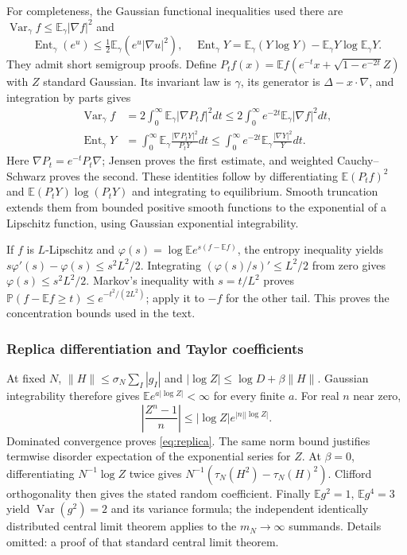 \documentclass[11pt]{article}
\numberwithin{equation}{section}
\theoremstyle{exposition}
\theoremstyle{result}
\newcommand{\E}{\mathbb E}
\newcommand{\Pp}{\mathbb P}
\begin{document}
For completeness, the Gaussian functional inequalities used there are $\operatorname{Var}_\gamma f\leq\E_\gamma|\nabla f|^2$ and
\begin{equation*}
\operatorname{Ent}_\gamma(e^u)
\leq\tfrac12\E_\gamma(e^u|\nabla u|^2),\quad
\operatorname{Ent}_\gamma Y=\E_\gamma(Y\log Y)-\E_\gamma Y\log\E_\gamma Y.
\end{equation*}
They admit short semigroup proofs. Define $P_tf(x)=\E f(e^{-t}x+\sqrt{1-e^{-2t}}Z)$ with $Z$ standard Gaussian. Its invariant law is $\gamma$, its generator is $\Delta-x\cdot\nabla$, and integration by parts gives
\begin{align*}
\operatorname{Var}_\gamma f
&=2\int_0^\infty\E_\gamma|\nabla P_tf|^2dt
\leq2\int_0^\infty e^{-2t}\E_\gamma|\nabla f|^2dt,\\
\operatorname{Ent}_\gamma Y
&=\int_0^\infty\E_\gamma\frac{|\nabla P_tY|^2}{P_tY}dt
\leq\int_0^\infty e^{-2t}\E_\gamma\frac{|\nabla Y|^2}{Y}dt.
\end{align*}
Here $\nabla P_t=e^{-t}P_t\nabla$; Jensen proves the first estimate, and weighted Cauchy--Schwarz proves the second. These identities follow by differentiating $\E(P_tf)^2$ and $\E(P_tY)\log(P_tY)$ and integrating to equilibrium. Smooth truncation extends them from bounded positive smooth functions to the exponential of a Lipschitz function, using Gaussian exponential integrability.

If $f$ is $L$-Lipschitz and $\varphi(s)=\log\E e^{s(f-\E f)}$, the entropy inequality yields $s\varphi'(s)-\varphi(s)\leq s^2L^2/2$. Integrating $(\varphi(s)/s)'\leq L^2/2$ from zero gives $\varphi(s)\leq s^2L^2/2$. Markov's inequality with $s=t/L^2$ proves $\Pp(f-\E f\geq t)\leq e^{-t^2/(2L^2)}$; apply it to $-f$ for the other tail. This proves the concentration bounds used in the text.

\subsubsection{Replica differentiation and Taylor coefficients}
At fixed $N$, $\|H\|\leq\sigma_N\sum_I|g_I|$ and $|\log Z|\leq\log D+\beta\|H\|$. Gaussian integrability therefore gives $\E e^{a|\log Z|}<\infty$ for every finite $a$. For real $n$ near zero,
\begin{equation*}
\left|\frac{Z^n-1}{n}\right|\leq|\log Z|e^{|n||\log Z|}.
\end{equation*}
Dominated convergence proves \eqref{eq:replica}. The same norm bound justifies termwise disorder expectation of the exponential series for $Z$. At $\beta=0$, differentiating $N^{-1}\log Z$ twice gives $N^{-1}(\tau_N(H^2)-\tau_N(H)^2)$. Clifford orthogonality then gives the stated random coefficient. Finally $\E g^2=1$, $\E g^4=3$ yield $\operatorname{Var}(g^2)=2$ and its variance formula; the independent identically distributed central limit theorem applies to the $m_N\to\infty$ summands. Details omitted: a proof of that standard central limit theorem.
\end{document}
